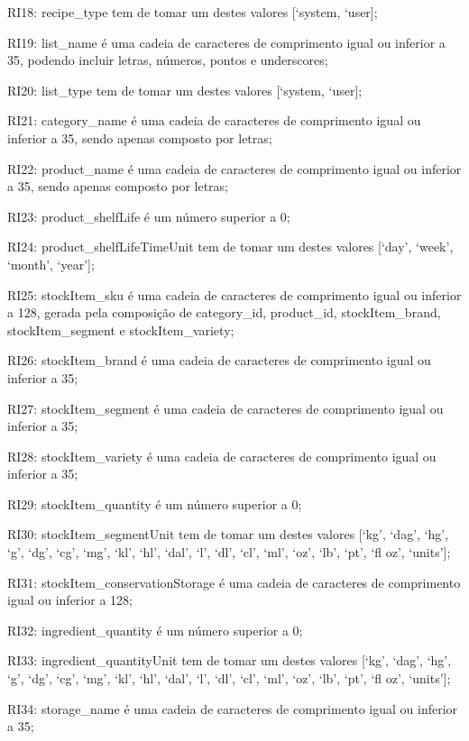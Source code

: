 \begin{description}
	\item RI18: recipe\_type tem de tomar um destes valores [‘system, ‘user];
	\item RI19: list\_name é uma cadeia de caracteres de comprimento igual ou inferior a 35, podendo incluir letras, números, pontos e underscores;
	\item RI20: list\_type tem de tomar um destes valores [‘system, ‘user];
	\item RI21: category\_name é uma cadeia de caracteres de comprimento igual ou inferior a 35, sendo apenas composto por letras;
	\item RI22: product\_name é uma cadeia de caracteres de comprimento igual ou inferior a 35, sendo apenas composto por letras;
	\item RI23: product\_shelfLife é um número superior a 0;
	\item RI24: product\_shelfLifeTimeUnit tem de tomar um destes valores [‘day’, ‘week’, ‘month’, ‘year’];
	\item RI25: stockItem\_sku é uma cadeia de caracteres de comprimento igual ou inferior a 128, gerada pela composição de category\_id, product\_id, stockItem\_brand, stockItem\_segment e stockItem\_variety;
	\item RI26: stockItem\_brand é uma cadeia de caracteres de comprimento igual ou inferior a 35;
	\item RI27: stockItem\_segment é uma cadeia de caracteres de comprimento igual ou inferior a 35;
	\item RI28: stockItem\_variety é uma cadeia de caracteres de comprimento igual ou inferior a 35;
	\item RI29: stockItem\_quantity é um número superior a 0;
	\item RI30: stockItem\_segmentUnit tem de tomar um destes valores [‘kg’, ‘dag’, ‘hg’, ‘g’, ‘dg’, ‘cg’, ‘mg’, ‘kl’, ‘hl’, ‘dal’, ‘l’, ‘dl’, ‘cl’, ‘ml’, ‘oz’, ‘lb’, ‘pt’, ‘fl oz’, ‘units’];
	\item RI31: stockItem\_conservationStorage é uma cadeia de caracteres de comprimento igual ou inferior a 128;
	\item RI32: ingredient\_quantity é um número superior a 0;
	\item RI33: ingredient\_quantityUnit tem de tomar um destes valores [‘kg’, ‘dag’, ‘hg’, ‘g’, ‘dg’, ‘cg’, ‘mg’, ‘kl’, ‘hl’, ‘dal’, ‘l’, ‘dl’, ‘cl’, ‘ml’, ‘oz’, ‘lb’, ‘pt’, ‘fl oz’, ‘units’];
	\item RI34: storage\_name é uma cadeia de caracteres de comprimento igual ou inferior a 35;
\end{description}

